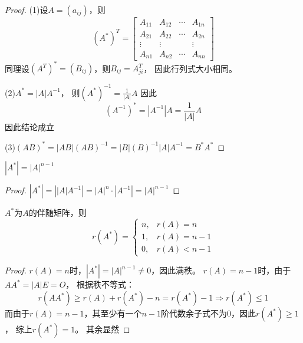 \begin{proof}
  (1)设$A = (a_{ij})$，则
  \begin{equation*}
    (A^{\ast})^T = \left[
      \begin{array}{cccc}
        A_{11}&A_{12}&\cdots&A_{1n} \\
              A_{21}&A_{22}&\cdots&A_{2n} \\
              \vdots&\vdots&&\vdots \\
              A_{n1}&A_{n2}&\cdots&A_{nn}
      \end{array}
    \right]
  \end{equation*}
  同理设$(A^T)^{\ast} = (B_{ij})$，则$B_{ij} = A^T_{ji}$，
  因此行列式大小相同。

  (2)$A^{\ast} = |A|A^{-1}$，
  则$(A^{\ast})^{-1} = \frac{1}{|A|}A$
  因此
  \begin{equation*}
    (A^{-1})^{\ast} = |A^{-1}|A = \frac{1}{|A|}A
  \end{equation*}
  因此结论成立

  (3)$(AB)^{\ast} = |AB|(AB)^{-1} = |B|(B)^{-1}|A|A^{-1} = B^{\ast}A^{\ast}$
\end{proof}

\begin{theorem}[伴随矩阵的行列式]
  $|A^{\ast}| = |A|^{n-1}$
\end{theorem}

\begin{proof}
  $|A^{\ast}| = \left| |A|A^{-1} \right| = |A|^n \cdot |A^{-1}| = |A|^{n-1}$
\end{proof}

\begin{theorem}[伴随矩阵的秩]
  $A^{\ast}$为$A$的伴随矩阵，则
  \begin{equation*}
    r(A^{\ast}) =
    \begin{cases}
      n, & r(A) = n\\
      1, & r(A) = n-1\\
      0, & r(A) < n-1
    \end{cases}
  \end{equation*}
\end{theorem}

\begin{proof}
  $r(A) = n$时，$|A^{\ast}| = |A|^{n-1} \neq 0$，因此满秩。
  $r(A) = n-1$时，由于$AA^{\ast} = |A|E = O$，
  根据秩不等式：
  \begin{equation*}
    r(AA^{\ast}) \geq r(A) + r(A^{\ast}) - n = r(A^{\ast}) - 1 \Rightarrow r(A^{\ast}) \leq 1
  \end{equation*}
  而由于$r(A) = n-1$，其至少有一个$n-1$阶代数余子式不为$0$，因此$r(A^{\ast}) \geq 1$，
  综上$r(A^{\ast}) = 1$。
  其余显然
\end{proof}

